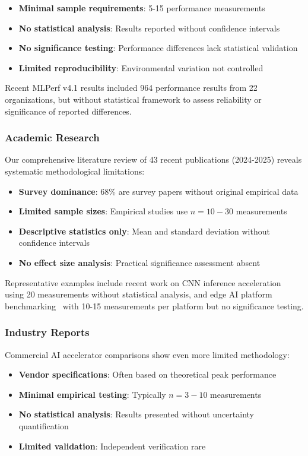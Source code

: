 \documentclass[manuscript]{acmart}
\begin{document}
\begin{itemize}
    \item \textbf{Minimal sample requirements}: 5-15 performance measurements
    \item \textbf{No statistical analysis}: Results reported without confidence intervals
    \item \textbf{No significance testing}: Performance differences lack statistical validation
    \item \textbf{Limited reproducibility}: Environmental variation not controlled
\end{itemize}

Recent MLPerf v4.1 results included 964 performance results from 22 organizations, but without statistical framework to assess reliability or significance of reported differences.

\subsubsection{Academic Research}
Our comprehensive literature review of 43 recent publications (2024-2025) reveals systematic methodological limitations:

\begin{itemize}
    \item \textbf{Survey dominance}: 68\% are survey papers without original empirical data
    \item \textbf{Limited sample sizes}: Empirical studies use $n = 10-30$ measurements
    \item \textbf{Descriptive statistics only}: Mean and standard deviation without confidence intervals
    \item \textbf{No effect size analysis}: Practical significance assessment absent
\end{itemize}

Representative examples include recent work on CNN inference acceleration~\cite{cnn_acceleration2024} using 20 measurements without statistical analysis, and edge AI platform benchmarking~\cite{benchmarking_edge2024} with 10-15 measurements per platform but no significance testing.

\subsubsection{Industry Reports}
Commercial AI accelerator comparisons show even more limited methodology:

\begin{itemize}
    \item \textbf{Vendor specifications}: Often based on theoretical peak performance
    \item \textbf{Minimal empirical testing}: Typically $n = 3-10$ measurements
    \item \textbf{No statistical analysis}: Results presented without uncertainty quantification
    \item \textbf{Limited validation}: Independent verification rare
\end{itemize}
\end{document}
